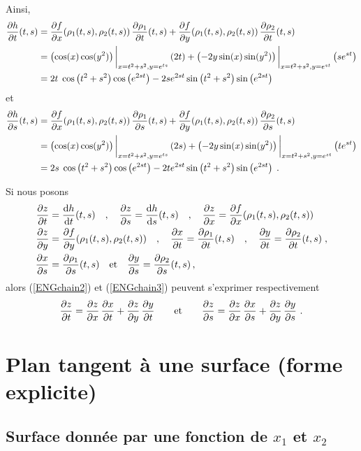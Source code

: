 {\begin{egg}
Ainsi,
\begin{align}
\frac{\partial h}{\partial t}(t,s) &= \frac{\partial f}{\partial x}(\rho_1(t,s),\rho_2(t,s))\,
\frac{\partial \rho_1}{\partial t}(t,s) + \frac{\partial f}{\partial y}(\rho_1(t,s),\rho_2(t,s)) \,
\frac{\partial \rho_2}{\partial t}(t,s) \label{ENGchain2} \\
&=\left(\cos(x)\cos(y^2)\right)\bigg|_{x=t^2+s^2,y=e^{ts}}
\left(2t\right)
+ \left(-2y\sin(x)\sin(y^2)\right)\bigg|_{x=t^2+s^2,y=e^{st}}
\left(se^{st}\right)  \nonumber  \\
&= 2t\;\cos\left(t^2+s^2\right)\cos\left(e^{2st}\right)
-2se^{2st}\sin\left(t^2+s^2\right)\sin\left(e^{2st}\right) \nonumber
\end{align}
et
\begin{align}
\frac{\partial h}{\partial s}(t,s) &= \frac{\partial f}{\partial x}(\rho_1(t,s),\rho_2(t,s))\,
\frac{\partial \rho_1}{\partial s}(t,s) + \frac{\partial f}{\partial y}(\rho_1(t,s),\rho_2(t,s)) \,
\frac{\partial \rho_2}{\partial s}(t,s) \label{ENGchain3} \\
&=\left(\cos(x)\cos(y^2)\right)\bigg|_{x=t^2+s^2,y=e^{ts}}
\left(2s\right)
+ \left(-2y\sin(x)\sin(y^2)\right)\bigg|_{x=t^2+s^2,y=e^{st}}
\left(te^{st}\right) \nonumber \\
&=2s\;\cos\left(t^2+s^2\right)\cos\left(e^{2st}\right)
-2te^{2st}\sin\left(t^2+s^2\right)\sin\left(e^{2st}\right) \; . \nonumber
\end{align}

Si nous posons
\begin{align*}
\frac{\partial z}{\partial t} &= \frac{\mathrm{d}h}{\mathrm{d}t}(t,s) \quad , \quad
\frac{\partial z}{\partial s} = \frac{\mathrm{d}h}{\mathrm{d}s}(t,s) \quad , \quad
\frac{\partial z}{\partial x} = \frac{\partial f}{\partial x}(\rho_1(t,s),\rho_2(t,s)) \; \\
\frac{\partial z}{\partial y} &= \frac{\partial f}{\partial y}(\rho_1(t,s),\rho_2(t,s)) \quad , \quad
\frac{\partial x}{\partial t} = \frac{\partial \rho_1}{\partial t}(t,s)\quad , \quad
\frac{\partial y}{\partial t} = \frac{\partial \rho_2}{\partial t}(t,s) \; , \\
\frac{\partial x}{\partial s} &= \frac{\partial \rho_1}{\partial s}(t,s)\quad \text{et} \quad
\frac{\partial y}{\partial s} = \frac{\partial \rho_2}{\partial s}(t,s) \, ,
\end{align*}
alors (\ref{ENGchain2}) et (\ref{ENGchain3}) peuvent s'exprimer
respectivement
\[
\frac{\partial z}{\partial t} = \frac{\partial z}{\partial x}\,\frac{\partial x}{\partial t} + \frac{\partial z}{\partial y} \,
\frac{\partial y}{\partial t} 
\qquad \text{et} \qquad
\frac{\partial z}{\partial s} = \frac{\partial z}{\partial x}\,\frac{\partial x}{\partial s} + \frac{\partial z}{\partial y} \,
\frac{\partial y}{\partial s} \ .
\]
\end{egg}

\section{Plan tangent à une surface (forme explicite)}

\subsection{Surface donnée par une fonction de $x_1$ et $x_2$}

}
